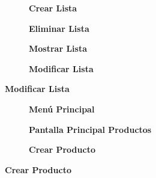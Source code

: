 \documentclass{article}
\begin{document}
\begin{figure}[H]
    \centering
    \begin{subfigure}{.5\textwidth}
        \centering
        \captionsetup{labelformat=empty}
        \caption{\textbf{Crear Lista}}
    \end{subfigure}%
    \begin{subfigure}{.5\textwidth}
        \centering
        \captionsetup{labelformat=empty}
        \caption{\textbf{Eliminar Lista}}
    \end{subfigure}
    
    \begin{subfigure}{.5\textwidth}
        \centering
        \captionsetup{labelformat=empty}
        \caption{\textbf{Mostrar Lista}}
    \end{subfigure}%
    \begin{subfigure}{.5\textwidth}
        \centering
        \captionsetup{labelformat=empty}
        \caption{\textbf{Modificar Lista}}
    \end{subfigure}
    \end{figure}

\begin{figure}[H]
    \centering
    \begin{subfigure}{.33\textwidth}
        \centering
        \captionsetup{labelformat=empty}
        \caption{\textbf{Menú Principal}}
    \end{subfigure}%
    \begin{subfigure}{.33\textwidth}
        \centering
        \captionsetup{labelformat=empty}
        \caption{\textbf{Pantalla Principal Productos}}
    \end{subfigure}%
    \begin{subfigure}{.33\textwidth}
        \centering
        \captionsetup{labelformat=empty}
        \caption{\textbf{Crear Producto}}
    \end{subfigure}    
\end{figure}
\end{document}
